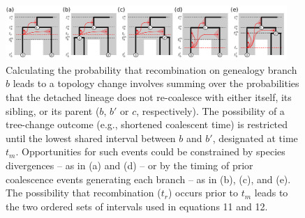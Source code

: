 \documentclass[11pt]{article}
\begin{document}
\begin{figure}[t]
	\centering
	\includegraphics[width=0.95\textwidth]{figures/FigS-tbm.pdf}
	\caption{
		Calculating the probability that recombination on genealogy branch 
		$b$ leads to a topology change involves summing over the probabilities 
		that the detached lineage does not re-coalesce with either
		itself, its sibling, or its parent ($b$, $b'$ or $c$, respectively). 
		The possibility of a tree-change outcome (e.g., shortened coalescent 
		time) is restricted until the lowest shared interval between $b$ and 
		$b'$, designated at time $t_m$. Opportunities for such events could be
		constrained by species divergences -- as in (a) and (d) -- or by the timing of 
		prior coalescence events generating each branch -- as in (b), (c), and (e). 
		The possibility that recombination ($t_r$) occurs prior
		to $t_m$ leads to the two ordered sets of intervals used in 
		equations 11 and 12.
	}
	\label{fig:figS-tbm}
\end{figure}

\end{document}
